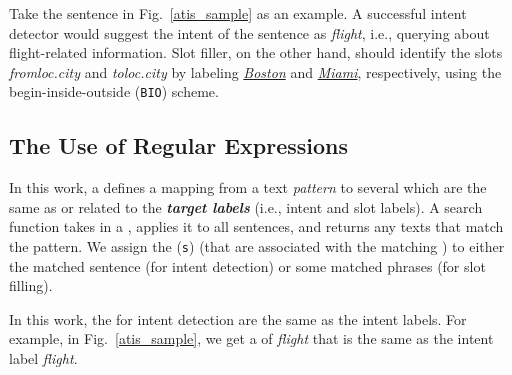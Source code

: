 
Take the sentence in Fig.~\ref{atis_sample} as an example.
A successful intent detector would suggest the intent of the sentence as \emph{flight}, i.e., querying
about flight-related information. Slot filler, on the other hand, should identify the slots \emph{fromloc.city} and
\emph{toloc.city} by labeling \underline{\textit{Boston}} and \underline{\textit{Miami}}, respectively,
using the begin-inside-outside (\texttt{BIO}) scheme.




\subsection{The Use of Regular Expressions}
\label{re_desc} \vspace{-2mm}

In this work, a \RE defines a mapping from a text \emph{pattern} to several \textbf{\emph{\REtags}} which are  the same as or related to
the \textbf{\emph{target labels}} (i.e., intent and slot labels). A search function takes in a \RE, applies it to all sentences, and
returns any texts that match the pattern. We assign the \REtag(\texttt{s}) (that are associated with the matching \RE) to either the
matched sentence (for intent detection) or some matched phrases (for slot filling).


In this work, the \REtags for intent detection are the same as the intent labels.
For example,  %
in Fig.~\ref{atis_sample},
we get a \REtag of \emph{flight} that is the same as %
 the intent label \emph{flight}.



